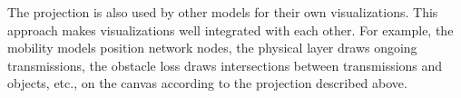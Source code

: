 The projection is also used by other models for their own visualizations. This
approach makes visualizations well integrated with each other. For example, the
mobility models position network nodes, the physical layer draws ongoing
transmissions, the obstacle loss draws intersections between transmissions and
objects, etc., on the canvas according to the projection described above.


